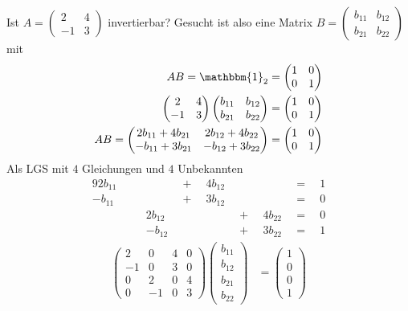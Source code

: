 Ist $A = \begin{pmatrix}2&4\\-1&3\end{pmatrix}$ invertierbar? Gesucht ist also eine Matrix $B = \begin{pmatrix}b_{11}&b_{12}\\b_{21}&b_{22}\end{pmatrix}$ mit
\begin{align*}
	AB = \mathbbm{1}_2 &= \begin{pmatrix}1&0\\0&1\end{pmatrix} \\
	\begin{pmatrix}2&4\\-1&3\end{pmatrix}\begin{pmatrix}b_{11}&b_{12}\\b_{21}&b_{22}\end{pmatrix} &= \begin{pmatrix}1&0\\0&1\end{pmatrix} \\
	AB = \begin{pmatrix}2b_{11}+4b_{21}&2b_{12}+4b_{22}\\-b_{11}+3b_{21}&-b_{12}+3b_{22}\end{pmatrix} &= \begin{pmatrix}1&0\\0&1\end{pmatrix}
\end{align*}
Als LGS mit $4$ Gleichungen und $4$ Unbekannten
\begin{alignat*}{9}
2b_{11} & \enspace\enspace & & \enspace+\enspace & 4b_{12} & & & \enspace=\enspace & 1 \\
-b_{11} & & & \enspace+\enspace & 3b_{12} & & & \enspace=\enspace & 0 \\
 & \enspace\enspace & 2b_{12} & & & \enspace+\enspace & 4b_{22} & \enspace=\enspace & 0 \\
 & \enspace\enspace & -b_{12} & & & \enspace+\enspace & 3b_{22} & \enspace=\enspace & 1
\end{alignat*}
\begin{align*}
	\begin{pmatrix}
		2 & 0 & 4 & 0 \\
		-1 & 0 & 3 & 0 \\
		0 & 2 & 0 & 4 \\
		0 & -1 & 0 & 3
	\end{pmatrix} \begin{pmatrix}
		b_{11} \\
		b_{12} \\
		b_{21} \\
		b_{22}
	\end{pmatrix} &= \begin{pmatrix}
		1 \\
		0 \\
		0 \\
		1
	\end{pmatrix}
\end{align*}

